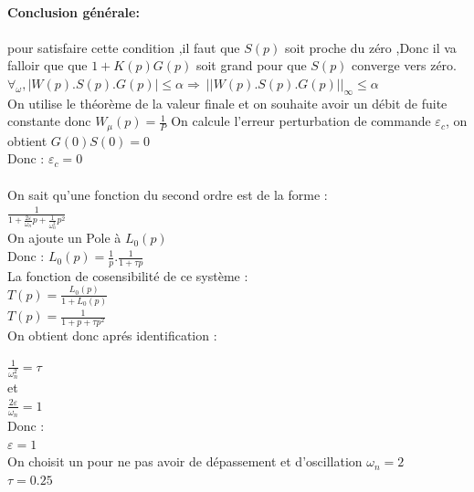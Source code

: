 \documentclass[12pt, a4paper, openany]{report}
\begin{document}
 \paragraph{}
 \textbf{Conclusion générale:} %
 
\newpage
\paragraph{}

pour satisfaire cette condition ,il faut que $S(p)$ soit proche du zéro ,Donc il va falloir  que que $1+K(p)G(p)$ soit grand  pour que $S(p)$ converge vers zéro.
$ \forall_{\omega}, |W(p).S(p).G(p)|\leq \alpha \Rightarrow\ ||W(p).S(p).G(p)||_{\infty} \leq \alpha $ \\
On utilise le théorème de la valeur finale et on souhaite avoir un débit de fuite constante donc $W_{\mu}(p)= \frac{1}{P} $
On calcule l'erreur perturbation de commande $ \varepsilon_{c} $, on obtient $ G(0)S(0)=0 $ \\
Donc : $ \varepsilon_{c}=0 $

\paragraph{}
On sait qu'une fonction du second ordre est de la forme : \\
$ \frac{1}{1+ \frac{2 \varepsilon }{ \omega_{n}} p + \frac{1}{ \omega_{n} ^ 2} p ^ 2} $ \\
On ajoute un Pole à $ L_{0}(p) $ \\

Donc : $ L_{0}(p)= \frac{1}{p} . \frac{1}{1+ \tau p} $ \\

La fonction de cosensibilité de ce système : \\
$ T(p) = \frac{L_{0}(p)}{1+ L_{0}(p)} $ \\
$ T(p) = \frac{1}{1 + p + \tau p^2}$ \\

On obtient donc aprés identification :

$ \frac{1}{\omega_{n}^2} = \tau $  \\

et \\
$ \frac{2 \varepsilon }{\omega_{n}} = 1 $ \\

Donc : \\

$ \varepsilon = 1  $ \\
On choisit un  pour ne pas avoir de dépassement et d’oscillation
$ \omega_{n} = 2 $ \\
$ \tau = 0.25 $ \\
\end{document}
